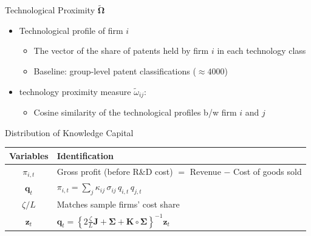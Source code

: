 \documentclass[
  aspectratio=169,  %
]{beamer}
\theoremstyle{plain}
\begin{document}
\begin{frame}{Technological Proximity $\widetilde{\symbf{\Omega}}$}
  \begin{itemize}
    \item Technological profile of firm $i$
          \begin{itemize}
            \item The vector of the share of patents held by firm
            $i$ in each technology class
            \item Baseline: group-level patent classifications ($\approx4000$)\medskip{}
          \end{itemize}
          \medskip{}
    \item \citet{Jaffe1986-yz} technology proximity measure $\tilde{\omega}_{ij}$:
      \begin{itemize}
      \item Cosine similarity of the technological profiles b/w firm $i$ and $j$
      \end{itemize}
  \end{itemize}
\end{frame}
%
\begin{frame}{Distribution of Knowledge Capital}
  \begin{table}[htbp]
    \centering
    \begin{tabular}{cl}
      \toprule
     Variables & Identification \\
      \midrule
      $\pi_{i,t}$ 
        & Gross profit (before R\&D cost) 
          $=$ Revenue $-$ Cost of goods sold \\[6pt]
      $\symbf{q}_t$
        &
          $\pi_{i,t}=\displaystyle\sum_{j}\kappa_{ij}\,\sigma_{ij}\,q_{i,t}\,q_{j,t}$ \\[6pt]
      $\zeta/L$
        & Matches sample firms’ cost share \\[6pt]
      $\symbf{z}_t$
        &
          $\displaystyle \symbf{q}_{t}
           =\left\{2\frac{\zeta}{L}\symbf{J}+\symbf{\Sigma}+\symbf{K}\circ\symbf{\Sigma}\right\}^{-1}\symbf{z}_{t}$ \\
      \bottomrule
    \end{tabular}
  \end{table}
\end{frame}
%
\end{document}
